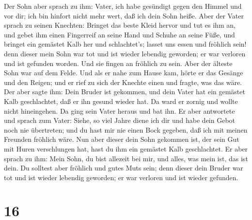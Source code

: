  Der Sohn aber sprach zu ihm: Vater, ich habe gesündigt
gegen den Himmel und vor dir; ich bin hinfort nicht mehr wert, daß ich
dein Sohn heiße.  Aber der Vater sprach zu seinen Knechten:
Bringet das beste Kleid hervor und tut es ihm an, und gebet ihm einen
Fingerreif an seine Hand und Schuhe an seine Füße,  und
bringet ein gemästet Kalb her und schlachtet's; lasset uns essen und
fröhlich sein!  denn dieser mein Sohn war tot und ist
wieder lebendig geworden; er war verloren und ist gefunden worden. Und
sie fingen an fröhlich zu sein.  Aber der älteste Sohn war
auf dem Felde. Und als er nahe zum Hause kam, hörte er das Gesänge und
den Reigen;  und er rief zu sich der Knechte einen und
fragte, was das wäre.  Der aber sagte ihm: Dein Bruder ist
gekommen, und dein Vater hat ein gemästet Kalb geschlachtet, daß er ihn
gesund wieder hat.  Da ward er zornig und wollte nicht
hineingehen. Da ging sein Vater heraus und bat ihn.  Er
aber antwortete und sprach zum Vater: Siehe, so viel Jahre diene ich dir
und habe dein Gebot noch nie übertreten; und du hast mir nie einen Bock
gegeben, daß ich mit meinen Freunden fröhlich wäre.  Nun
aber dieser dein Sohn gekommen ist, der sein Gut mit Huren verschlungen
hat, hast du ihm ein gemästet Kalb geschlachtet.  Er aber
sprach zu ihm: Mein Sohn, du bist allezeit bei mir, und alles, was mein
ist, das ist dein.  Du solltest aber fröhlich und gutes
Muts sein; denn dieser dein Bruder war tot und ist wieder lebendig
geworden; er war verloren und ist wieder gefunden.

\hypertarget{section-15}{%
\section{16}\label{section-15}}

